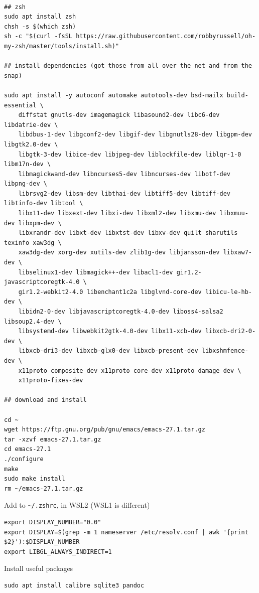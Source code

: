 \documentclass[11pt]{article}
\begin{document}
\begin{verbatim}

## zsh
sudo apt install zsh
chsh -s $(which zsh)
sh -c "$(curl -fsSL https://raw.githubusercontent.com/robbyrussell/oh-my-zsh/master/tools/install.sh)"

## install dependencies (got those from all over the net and from the snap)

sudo apt install -y autoconf automake autotools-dev bsd-mailx build-essential \
    diffstat gnutls-dev imagemagick libasound2-dev libc6-dev libdatrie-dev \
    libdbus-1-dev libgconf2-dev libgif-dev libgnutls28-dev libgpm-dev libgtk2.0-dev \
    libgtk-3-dev libice-dev libjpeg-dev liblockfile-dev liblqr-1-0 libm17n-dev \
    libmagickwand-dev libncurses5-dev libncurses-dev libotf-dev libpng-dev \
    librsvg2-dev libsm-dev libthai-dev libtiff5-dev libtiff-dev libtinfo-dev libtool \
    libx11-dev libxext-dev libxi-dev libxml2-dev libxmu-dev libxmuu-dev libxpm-dev \
    libxrandr-dev libxt-dev libxtst-dev libxv-dev quilt sharutils texinfo xaw3dg \
    xaw3dg-dev xorg-dev xutils-dev zlib1g-dev libjansson-dev libxaw7-dev \
    libselinux1-dev libmagick++-dev libacl1-dev gir1.2-javascriptcoregtk-4.0 \
    gir1.2-webkit2-4.0 libenchant1c2a libglvnd-core-dev libicu-le-hb-dev \
    libidn2-0-dev libjavascriptcoregtk-4.0-dev liboss4-salsa2 libsoup2.4-dev \
    libsystemd-dev libwebkit2gtk-4.0-dev libx11-xcb-dev libxcb-dri2-0-dev \
    libxcb-dri3-dev libxcb-glx0-dev libxcb-present-dev libxshmfence-dev \
    x11proto-composite-dev x11proto-core-dev x11proto-damage-dev \
    x11proto-fixes-dev

## download and install

cd ~
wget https://ftp.gnu.org/pub/gnu/emacs/emacs-27.1.tar.gz
tar -xzvf emacs-27.1.tar.gz
cd emacs-27.1
./configure
make
sudo make install
rm ~/emacs-27.1.tar.gz

\end{verbatim}

Add to \texttt{\textasciitilde{}/.zshrc}, in WSL2 (WSL1 is different)
\begin{verbatim}
export DISPLAY_NUMBER="0.0"
export DISPLAY=$(grep -m 1 nameserver /etc/resolv.conf | awk '{print $2}'):$DISPLAY_NUMBER
export LIBGL_ALWAYS_INDIRECT=1
\end{verbatim}

Install useful packages
\begin{verbatim}
sudo apt install calibre sqlite3 pandoc
\end{verbatim}
\end{document}
